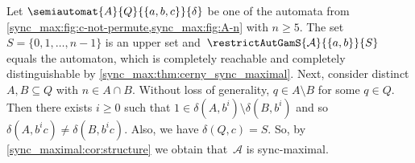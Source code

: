 \begin{example} \label{ex:sync_max_not_compl_reachable_Cerny}
	Let $\semiautomat{A}{Q}{\{a,b,c\}}{\delta}$
	be one of the automata from \cref{sync_max:fig:c-not-permute,sync_max:fig:A-n}
	with $n \ge 5$.
	The set $S = \{0,1,\ldots,n-1\}$ is an upper set
	and~$\restrictAutGamS{\mathcal A}{\{a,b\}}{S}$
	equals the \Cerny automaton,
	which is completely reachable and completely distinguishable	
	by \cref{sync_max:thm:cerny_sync_maximal}.
	Next, consider distinct $A,B \subseteq Q$ with $n \in A \cap B$.
	Without loss of generality, $q \in A \setminus B$ for some $q \in Q$.
	Then there exists $i \ge 0$ such that 
	$1 \in \delta(A, b^i) \setminus \delta(B, b^i)$
	and so $\delta(A, b^ic) \ne \delta(B, b^ic)$.
	Also, we have $\delta(Q, c) = S$.   		
	So, by \cref{sync_maximal:cor:structure} 
	we obtain that~$\mathcal A$
	is sync-maximal.	
	
	\begin{figure}[ht]
		\centering
		\begin{subfigure}[b]{0.34\textwidth}
			\centering
\end{subfigure}
\end{figure}
\end{example}
